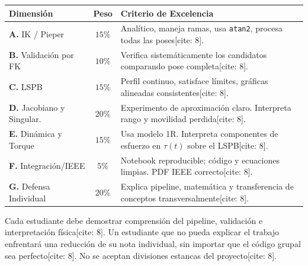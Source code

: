 \documentclass[11pt, a4paper]{article}
\begin{document}
\vspace{0.3cm}
\renewcommand{\arraystretch}{1.5}
\begin{tabularx}{\textwidth}{|>{\hsize=0.8\hsize\raggedright\arraybackslash}X|c|>{\hsize=1.2\hsize\raggedright\arraybackslash}X|}
\hline
\rowcolor{gray!20} \textbf{Dimensión} & \textbf{Peso} & \textbf{Criterio de Excelencia} \\ \hline
\textbf{A.} IK / Pieper & $15\%$ & Analítico, maneja ramas, usa \texttt{atan2}, procesa todas las poses[cite: 8]. \\ \hline
\textbf{B.} Validación por FK & $10\%$ & Verifica sistemáticamente los candidatos comparando pose completa[cite: 8]. \\ \hline
\textbf{C.} LSPB & $15\%$ & Perfil continuo, satisface límites, gráficas alineadas consistentes[cite: 8]. \\ \hline
\textbf{D.} Jacobiano y Singular. & $20\%$ & Experimento de aproximación claro. Interpreta rango y movilidad perdida[cite: 8]. \\ \hline
\textbf{E.} Dinámica y Torque & $15\%$ & Usa modelo 1R. Interpreta componentes de esfuerzo en $\tau(t)$ sobre el LSPB[cite: 8]. \\ \hline
\textbf{F.} Integración/IEEE & $5\%$ & Notebook reproducible; código y ecuaciones limpias. PDF IEEE correcto[cite: 8]. \\ \hline
\textbf{G.} Defensa Individual & $20\%$ & Explica pipeline, matemática y transferencia de conceptos transversalmente[cite: 8]. \\ \hline
\end{tabularx}

\vspace{0.4cm}
\begin{tcolorbox}[colback=red!5, colframe=red!70!black, title=\textbf{Regla de Desempeño Individual Mínimo[cite: 8]}]
    Cada estudiante debe demostrar comprensión del pipeline, validación e interpretación física[cite: 8]. Un estudiante que no pueda explicar el trabajo enfrentará una reducción de su nota individual, sin importar que el código grupal sea perfecto[cite: 8]. No se aceptan divisiones estancas del proyecto[cite: 8].
\end{tcolorbox}
\end{document}
